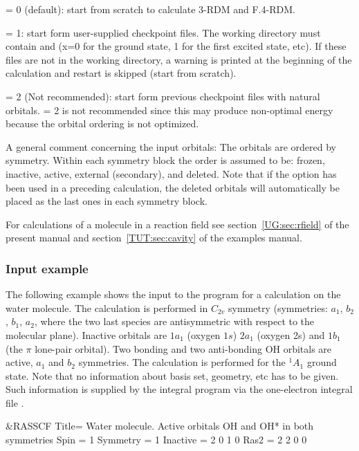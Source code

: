 \begin{keywordlist}
 = 0 (default): start from scratch to calculate 3-RDM and F.4-RDM.

 = 1: start form user-supplied checkpoint files. 
The working directory must contain  
and  (x=0 for the ground state, 
1 for the first excited state, etc). 
If these files are not in the working directory, a warning is printed at the 
beginning of the calculation and restart is skipped (start from scratch).

 = 2 (Not recommended): start form previous checkpoint files with natural orbitals. 
 = 2 is not recommended since this may produce non-optimal energy 
because the orbital ordering is not optimized.
\end{keywordlist}

A general comment concerning the input orbitals: The orbitals are ordered by
symmetry. Within each symmetry block the order is assumed to be:
frozen, inactive, active, external (secondary), and deleted. Note that
if the  option has been used in a preceding
 calculation, the deleted orbitals will automatically be placed as
the last ones in each symmetry block.

For calculations of a molecule in a reaction field see section~\ref{UG:sec:rfield}
of the present manual and section~\ref{TUT:sec:cavity} of the examples manual.

\subsubsection{Input example}

The following example shows the input to the
 program for a calculation on the water molecule. The calculation is
performed in $C_{2v}$ symmetry (symmetries: $a_1$, $b_2$, $b_1$, $a_2$, where the two
last species are antisymmetric with respect to the molecular plane). Inactive
orbitals are $1a_1$ (oxygen $1s$) $2a_1$ (oxygen 2s) and
$1b_1$ (the $\pi$ lone-pair orbital). Two bonding and two anti-bonding
OH orbitals are active, $a_1$ and $b_2$ symmetries. The calculation is
performed for the $^1A_1$ ground state. Note that no information about basis set,
geometry, etc has to be given. Such information is supplied by the
 integral program via the one-{}electron integral file .

\begin{inputlisting}
 &RASSCF
Title= Water molecule. Active orbitals OH and OH* in both symmetries
Spin     = 1
Symmetry = 1
Inactive = 2 0 1 0
Ras2     = 2 2 0 0
\end{inputlisting}

